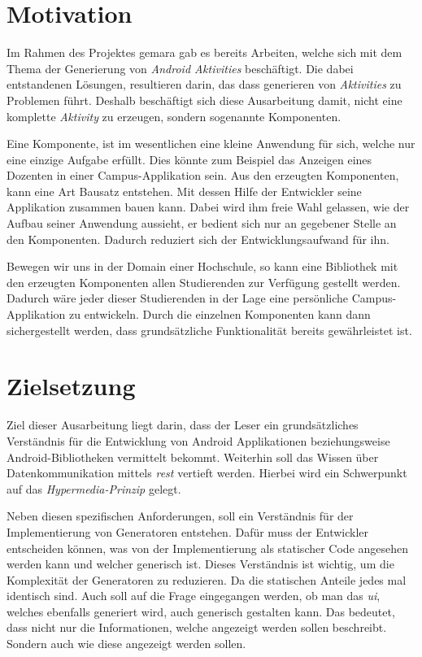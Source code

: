 \section{Motivation}\label{sec:motivation}
Im Rahmen des Projektes \ac{gemara} gab es bereits Arbeiten, welche sich mit dem Thema der Generierung von \textit{Android Aktivities} beschäftigt. Die dabei entstandenen Lösungen, resultieren darin, das dass generieren von \textit{Aktivities} zu Problemen führt. Deshalb beschäftigt sich diese Ausarbeitung damit, nicht eine komplette \textit{Aktivity} zu erzeugen, sondern sogenannte Komponenten.

Eine Komponente, ist im wesentlichen eine kleine Anwendung für sich, welche nur eine einzige Aufgabe erfüllt. Dies könnte zum Beispiel das Anzeigen eines Dozenten in einer Campus-Applikation sein.
Aus den erzeugten Komponenten, kann eine Art Bausatz entstehen. Mit dessen Hilfe der Entwickler seine Applikation zusammen bauen kann. Dabei wird ihm freie Wahl gelassen, wie der Aufbau seiner Anwendung aussieht, er bedient sich nur an gegebener Stelle an den Komponenten. Dadurch reduziert sich der Entwicklungsaufwand für ihn.

Bewegen wir uns in der Domain einer Hochschule, so kann eine Bibliothek mit den erzeugten Komponenten allen Studierenden zur Verfügung gestellt werden. Dadurch wäre jeder dieser Studierenden in der Lage eine persönliche Campus-Applikation zu entwickeln. Durch die einzelnen Komponenten kann dann sichergestellt werden, dass grundsätzliche Funktionalität bereits gewährleistet ist.

\section{Zielsetzung}\label{sec:target}
Ziel dieser Ausarbeitung liegt darin, dass der Leser ein grundsätzliches Verständnis für die Entwicklung von Android Applikationen beziehungsweise Android-Bibliotheken vermittelt bekommt. Weiterhin soll das Wissen über Datenkommunikation mittels \textit{\ac{rest}} vertieft werden. Hierbei wird ein Schwerpunkt auf das \textit{Hypermedia-Prinzip} gelegt. 

Neben diesen spezifischen Anforderungen, soll ein Verständnis für der Implementierung von Generatoren entstehen. Dafür muss der Entwickler entscheiden können, was von der Implementierung als statischer Code angesehen werden kann und welcher generisch ist. Dieses Verständnis ist wichtig, um die Komplexität der Generatoren zu reduzieren. Da die statischen Anteile jedes mal identisch sind.
Auch soll auf die Frage eingegangen werden, ob man das \textit{\ac{ui}}, welches ebenfalls generiert wird, auch generisch gestalten kann. Das bedeutet, dass nicht nur die Informationen, welche angezeigt werden sollen beschreibt. Sondern auch wie diese angezeigt werden sollen.

